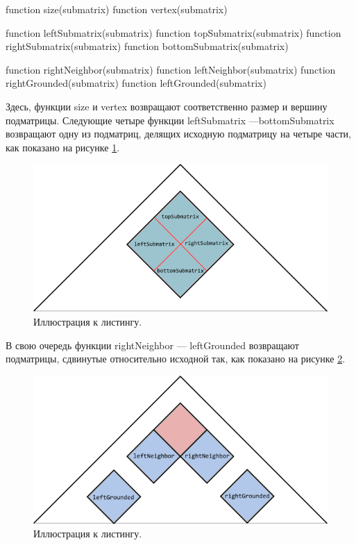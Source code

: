 \documentclass[12pt]{article}  %
\theoremstyle{definition}
\theoremstyle{remark}
\begin{document}
\begin{algorithm}[caption={Submatrix helpers.}, label={helpers}]
function size(submatrix)
function vertex(submatrix)

function leftSubmatrix(submatrix)
function topSubmatrix(submatrix)
function rightSubmatrix(submatrix)
function bottomSubmatrix(submatrix)

function rightNeighbor(submatrix)
function leftNeighbor(submatrix)
function rightGrounded(submatrix)
function leftGrounded(submatrix)     
\end{algorithm}

Здесь, функции size и vertex возвращают соответственно размер и вершину подматрицы. Следующие четыре функции leftSubmatrix ---\linebreak bottomSubmatrix возвращают одну из подматриц, делящих исходную подматрицу на четыре части, как показано на рисунке \ref{gr:inner}.


\begin{figure}[!ht]
  \caption{Иллюстрация к листингу.}
  \label{gr:inner}
  \centering
    \includegraphics[width=0.9\linewidth]{inner.png}
\end{figure}

\pagebreak

В свою очередь функции rightNeighbor --- leftGrounded возвращают подматрицы, сдвинутые относительно исходной так, как показано на рисунке \ref{gr:outer}.

\begin{figure}[!ht]
  \caption{Иллюстрация к листингу.}
  \label{gr:outer}
  \centering
    \includegraphics[width=0.9\linewidth]{outer.png}
\end{figure}
\end{document}
